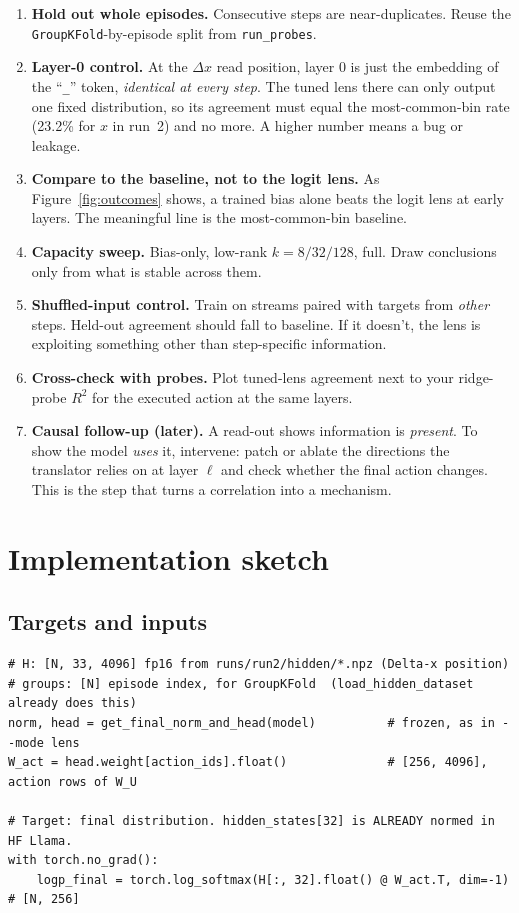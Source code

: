 \documentclass[11pt]{article}
\begin{document}
\begin{enumerate}
  \item \textbf{Hold out whole episodes.} Consecutive steps are near-duplicates. Reuse the \texttt{GroupKFold}-by-episode split from \texttt{run\_probes}.
  \item \textbf{Layer-0 control.} At the $\Delta x$ read position, layer 0 is just the embedding of the ``\texttt{\_}'' token, \emph{identical at every step}. The tuned lens there can only output one fixed distribution, so its agreement must equal the most-common-bin rate (23.2\% for $x$ in run~2) and no more. A higher number means a bug or leakage.
  \item \textbf{Compare to the baseline, not to the logit lens.} As Figure~\ref{fig:outcomes} shows, a trained bias alone beats the logit lens at early layers. The meaningful line is the most-common-bin baseline.
  \item \textbf{Capacity sweep.} Bias-only, low-rank $k=8/32/128$, full. Draw conclusions only from what is stable across them.
  \item \textbf{Shuffled-input control.} Train on streams paired with targets from \emph{other} steps. Held-out agreement should fall to baseline. If it doesn't, the lens is exploiting something other than step-specific information.
  \item \textbf{Cross-check with probes.} Plot tuned-lens agreement next to your ridge-probe $R^2$ for the executed action at the same layers.
  \item \textbf{Causal follow-up (later).} A read-out shows information is \emph{present}. To show the model \emph{uses} it, intervene: patch or ablate the directions the translator relies on at layer $\ell$ and check whether the final action changes. This is the step that turns a correlation into a mechanism.
\end{enumerate}

\section{Implementation sketch}

\subsection{Targets and inputs}
\begin{lstlisting}
# H: [N, 33, 4096] fp16 from runs/run2/hidden/*.npz (Delta-x position)
# groups: [N] episode index, for GroupKFold  (load_hidden_dataset already does this)
norm, head = get_final_norm_and_head(model)          # frozen, as in --mode lens
W_act = head.weight[action_ids].float()              # [256, 4096], action rows of W_U

# Target: final distribution. hidden_states[32] is ALREADY normed in HF Llama.
with torch.no_grad():
    logp_final = torch.log_softmax(H[:, 32].float() @ W_act.T, dim=-1)   # [N, 256]
\end{lstlisting}
\end{document}
